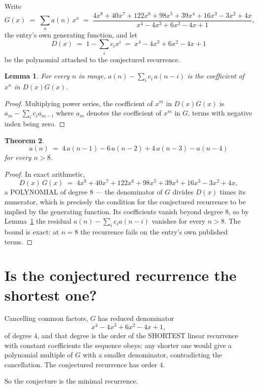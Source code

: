 \documentclass[11pt,a4paper]{article}
\theoremstyle{plain}
\newtheorem{theorem}{Theorem}
\newtheorem{lemma}[theorem]{Lemma}
\theoremstyle{definition}
\begin{document}
Write
\[
G(x)\;=\;\sum_{n}a(n)\,x^{n}\;=\;\frac{4 x^{8} + 40 x^{7} + 122 x^{6} + 98 x^{5} + 39 x^{4} + 16 x^{3} - 3 x^{2} + 4 x}{x^{4} - 4 x^{3} + 6 x^{2} - 4 x + 1},
\]
the entry's own generating function, and let
\[
D(x)\;=\;1-\sum_i c_i x^{i}\;=\;x^{4} - 4 x^{3} + 6 x^{2} - 4 x + 1
\]
be the polynomial attached to the conjectured recurrence.

\begin{lemma}\label{lem:key}
For every $n$ in range, $a(n)-\sum_i c_i\,a(n-i)$ is the coefficient of $x^{n}$ in
$D(x)G(x)$.
\end{lemma}

\begin{proof}
Multiplying power series, the coefficient of $x^{m}$ in $D(x)G(x)$ is
$a_m-\sum_i c_i a_{m-i}$ where $a_m$ denotes the coefficient of $x^{m}$ in $G$, terms with
negative index being zero.
\end{proof}

\begin{theorem}
\[
a(n)\;=\;4\,a(n-1) - 6\,a(n-2) + 4\,a(n-3) - a(n-4)
\]
for every $n>8$.
\end{theorem}

\begin{proof}
In exact arithmetic,
\[
D(x)\,G(x)\;=\;4 x^{8} + 40 x^{7} + 122 x^{6} + 98 x^{5} + 39 x^{4} + 16 x^{3} - 3 x^{2} + 4 x,
\]
a POLYNOMIAL of degree $8$ --- the denominator of $G$ divides $D(x)$ times its numerator,
which is precisely the condition for the conjectured recurrence to be implied by the
generating function. Its coefficients vanish beyond degree $8$, so by
Lemma~\ref{lem:key} the residual $a(n)-\sum_ic_ia(n-i)$ vanishes for every
$n>8$. The bound is exact: at $n=8$ the recurrence fails on the entry's own published terms.
\end{proof}

\section{Is the conjectured recurrence the shortest one?}

Cancelling common factors, $G$ has reduced denominator
\[
x^{4} - 4 x^{3} + 6 x^{2} - 4 x + 1,
\]
of degree $4$, and that degree is the order of the SHORTEST linear recurrence with
constant coefficients the sequence obeys: any shorter one would give a polynomial multiple of
$G$ with a smaller denominator, contradicting the cancellation. The conjectured recurrence has
order $4$.

So the conjecture is the minimal recurrence.
\end{document}
